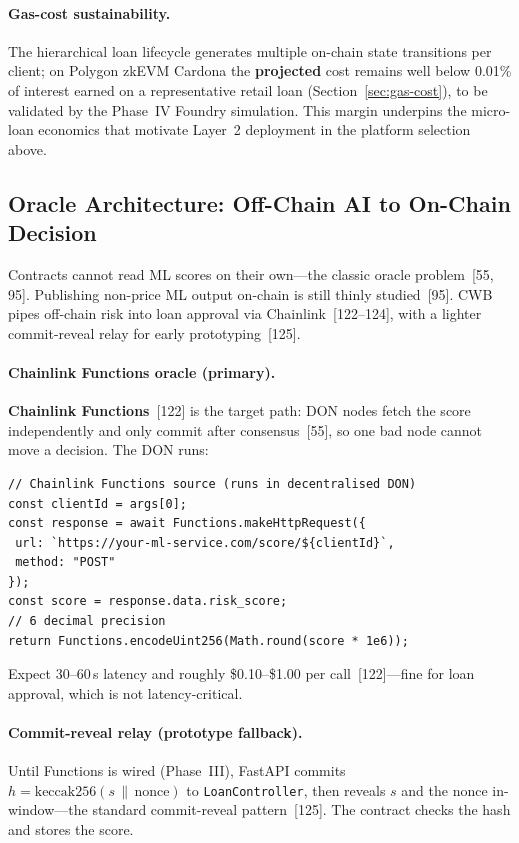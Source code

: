 \documentclass[12pt, a4paper]{report}
\begin{document}
\paragraph{Gas-cost sustainability.}
The hierarchical loan lifecycle generates multiple on-chain state transitions per client; on Polygon zkEVM Cardona the \textbf{projected} cost remains well below 0.01\% of interest earned on a representative retail loan (Section~\ref{sec:gas-cost}), to be validated by the Phase~IV Foundry simulation. This margin underpins the micro-loan economics that motivate Layer~2 deployment in the platform selection above.

\subsection{Oracle Architecture: Off-Chain AI to On-Chain Decision}
\label{sec:oracle-architecture}

Contracts cannot read ML scores on their own---the classic oracle problem~[55, 95]. Publishing non-price ML output on-chain is still thinly studied~[95]. CWB pipes off-chain risk into loan approval via Chainlink~[122--124], with a lighter commit-reveal relay for early prototyping~[125].

\paragraph{Chainlink Functions oracle (primary).}
\textbf{Chainlink Functions}~[122] is the target path: DON nodes fetch the score independently and only commit after consensus~[55], so one bad node cannot move a decision. The DON runs:

\begin{verbatim}
// Chainlink Functions source (runs in decentralised DON)
const clientId = args[0];
const response = await Functions.makeHttpRequest({
 url: `https://your-ml-service.com/score/${clientId}`,
 method: "POST"
});
const score = response.data.risk_score;
// 6 decimal precision
return Functions.encodeUint256(Math.round(score * 1e6));
\end{verbatim}

Expect 30--60\,s latency and roughly \$0.10--\$1.00 per call~[122]---fine for loan approval, which is not latency-critical.

\paragraph{Commit-reveal relay (prototype fallback).}
Until Functions is wired (Phase~III), FastAPI commits $h = \text{keccak256}(s \,\|\, \text{nonce})$ to \texttt{LoanController}, then reveals $s$ and the nonce in-window---the standard commit-reveal pattern~[125]. The contract checks the hash and stores the score.
\end{document}
